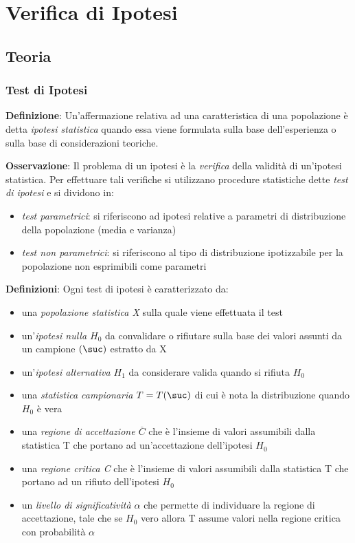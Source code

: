 \newcommand{\abs}[1]{\left|#1\right|}

\chapter{Verifica di Ipotesi}

\section{Teoria}

\subsection{Test di Ipotesi}

\textbf{Definizione}: Un’affermazione relativa ad una caratteristica di una popolazione è detta \textit{ipotesi statistica} quando essa viene formulata sulla base dell’esperienza o sulla base di considerazioni teoriche. \n

\ind \textbf{Osservazione}: Il problema di un ipotesi è la \textit{verifica} della validità di un'ipotesi statistica. Per effettuare tali verifiche si utilizzano procedure statistiche dette \textit{test di ipotesi} e si dividono in:
\begin{itemize}
    \item \textit{test parametrici}: si riferiscono ad ipotesi relative a parametri di distribuzione della popolazione (media e varianza)
    \item \textit{test non parametrici}: si riferiscono al tipo di distribuzione ipotizzabile per la popolazione non esprimibili come parametri
\end{itemize}

\ind \textbf{Definizioni}: Ogni test di ipotesi è caratterizzato da:
\begin{itemize}
    \item una \textit{popolazione statistica X} sulla quale viene effettuata il test
    \item un'\textit{ipotesi nulla $H_0$} da convalidare o rifiutare sulla base dei valori assunti da un campione $(\suc)$ estratto da X
    \item un'\textit{ipotesi alternativa $H_1$} da considerare valida quando si rifiuta $H_0$
    \item una \textit{statistica campionaria $T=T(\suc)$} di cui è nota la distribuzione quando $H_0$ è vera
    \item una \textit{regione di accettazione $\overline{C}$} che è l'insieme di valori assumibili dalla statistica T che portano ad un'accettazione dell'ipotesi $H_0$
    \item una \textit{regione critica C} che è l'insieme di valori assumibili dalla statistica T che portano ad un rifiuto dell'ipotesi $H_0$
    \item un \textit{livello di significatività $\alpha$} che permette di individuare la regione di accettazione, tale che se $H_0$ vero allora T assume valori nella regione critica con probabilità $\alpha$
\end{itemize}

